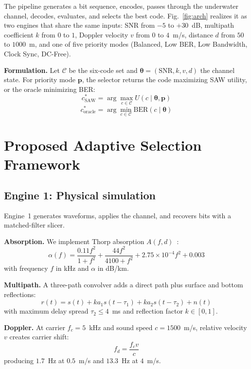 \documentclass[conference]{IEEEtran}
\begin{document}
The pipeline generates a bit sequence, encodes, passes through the underwater channel, decodes, evaluates, and selects the best code. Fig.~\ref{fig:arch} realizes it as two engines that share the same inputs: SNR from $-5$ to $+30$~dB, multipath coefficient $k$ from $0$ to $1$, Doppler velocity $v$ from $0$ to $4$~m/s, distance $d$ from $50$ to $1000$~m, and one of five priority modes (Balanced, Low BER, Low Bandwidth, Clock Sync, DC-Free).

\textbf{Formulation.} Let $\mathcal{C}$ be the six-code set and $\boldsymbol{\theta} = (\text{SNR}, k, v, d)$ the channel state. For priority mode $\mathbf{p}$, the selector returns the code maximizing SAW utility, or the oracle minimizing BER:
\begin{equation}
c_{\text{SAW}}^* = \arg\max_{c \in \mathcal{C}} U(c \mid \boldsymbol{\theta}, \mathbf{p})
\end{equation}
\begin{equation}
c_{\text{oracle}}^* = \arg\min_{c \in \mathcal{C}} \text{BER}(c \mid \boldsymbol{\theta})
\end{equation}

\section{Proposed Adaptive Selection Framework}

\subsection{Engine 1: Physical simulation}
Engine~1 generates waveforms, applies the channel, and recovers bits with a matched-filter slicer.

\textbf{Absorption.} We implement Thorp absorption $A(f, d)$~\cite{thorp1967analytic}:
\begin{equation}
\alpha(f) = \frac{0.11 f^2}{1 + f^2} + \frac{44 f^2}{4100 + f^2} + 2.75 \times 10^{-4} f^2 + 0.003
\end{equation}
with frequency $f$ in kHz and $\alpha$ in dB/km.

\textbf{Multipath.} A three-path convolver adds a direct path plus surface and bottom reflections:
\begin{equation}
r(t) = s(t) + k a_1 s(t - \tau_1) + k a_2 s(t - \tau_2) + n(t)
\end{equation}
with maximum delay spread $\tau_2 \le 4$~ms and reflection factor $k \in [0, 1]$.

\textbf{Doppler.} At carrier $f_c = 5$~kHz and sound speed $c = 1500$~m/s, relative velocity $v$ creates carrier shift:
\begin{equation}
f_d = \frac{f_c v}{c}
\end{equation}
producing $1.7$~Hz at $0.5$~m/s and $13.3$~Hz at $4$~m/s.
\end{document}
